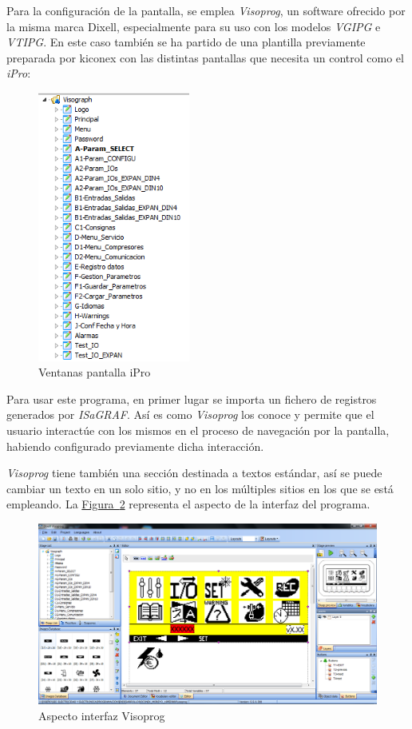 Para la configuración de la pantalla, se emplea \textit{Visoprog}, un software ofrecido por la misma marca Dixell, especialmente para su uso con los modelos \textit{VGIPG} e \textit{VTIPG}. En este caso también se ha partido de una plantilla previamente preparada por kiconex con las distintas pantallas que necesita un control como el \textit{iPro}:

\begin{figure}[H]
  \centering
  \includegraphics[width=5cm, keepaspectratio]{img/ventanasVisoprog}
  \caption{Ventanas pantalla iPro}
  \label{figura:ventanasIpro}
\end{figure}

Para usar este programa, en primer lugar se importa un fichero de registros generados por \textit{ISaGRAF}. Así es como \textit{Visoprog} los conoce y permite que el usuario interactúe con los mismos en el proceso de navegación por la pantalla, habiendo configurado previamente dicha interacción.

\textit{Visoprog} tiene también una sección destinada a textos estándar, así se puede cambiar un texto en un solo sitio, y no en los múltiples sitios en los que se está empleando. La \hyperref[figura:interfazVisoprog]{Figura~\ref{figura:interfazVisoprog}} representa el aspecto de la interfaz del programa.

\begin{figure}[H]
  \centering
  \includegraphics[width=\textwidth, keepaspectratio]{img/interfazVisoprog}
  \caption{Aspecto interfaz Visoprog}
  \label{figura:interfazVisoprog}
\end{figure}

